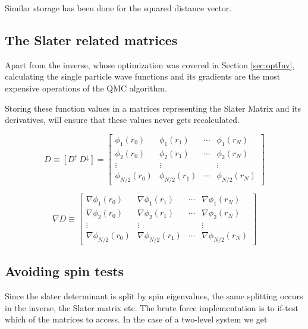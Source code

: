 Similar storage has been done for the squared distance vector. 

\subsection{The Slater related matrices}
\label{sec:storeSlater}

Apart from the inverse, whose optimization was covered in Section \ref{sec:optInv}, calculating the single particle wave functions and its gradients are the most expensive operations of the QMC algorithm.

Storing these function values in a matrices representing the Slater Matrix and its derivatives, will ensure that these values never gets recalculated. 

\begin{equation}
\label{eq:slaterConcat}
 D  \equiv \left[D^\uparrow\,D^\downarrow\right] = \left[ \begin{array}{cccc}
\phi_1(r_0)     & \phi_1(r_1)     & \cdots & \phi_1(r_N)       \\
\phi_2(r_0)     & \phi_2(r_1)     & \cdots & \phi_2(r_N)       \\
\vdots          & \vdots          &        & \vdots            \\
\phi_{N/2}(r_0) & \phi_{N/2}(r_1) & \cdots & \phi_{N/2}(r_N)   \end{array} \right]
\end{equation}

\begin{equation}
\label{eq:slaterDellConcat}
 \nabla D \equiv \left[ \begin{array}{cccc}
\nabla \phi_1(r_0)     & \nabla \phi_1(r_1)     & \cdots & \nabla \phi_1(r_N)       \\
\nabla \phi_2(r_0)     & \nabla \phi_2(r_1)     & \cdots & \nabla \phi_2(r_N)       \\
\vdots                 & \vdots                 &        & \vdots                   \\
\nabla \phi_{N/2}(r_0) & \nabla \phi_{N/2}(r_1) & \cdots & \nabla \phi_{N/2}(r_N)   \end{array} \right]
\end{equation}

\subsection{Avoiding spin tests}

Since the slater determinant is split by spin eigenvalues, the same splitting occurs in the inverse, the Slater matrix etc. The brute force implementation is to if-test which of the matrices to access. In the case of a two-level system we get

